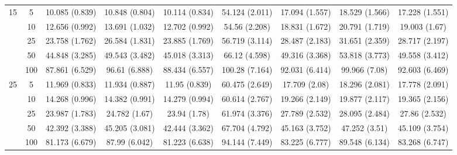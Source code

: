 \documentclass[10pt]{article}
\theoremstyle{definition}
\begin{document}
\begin{sidewaysfigure}
\begin{tabular}{cc|ccc|cccc}
  \multirow{5}{*}{15} & 5  & 10.085 (0.839) & 10.848 (0.804) & 10.114 (0.834) & 54.124 (2.011) & 17.094 (1.557) & 18.529 (1.566) & 17.228 (1.551) \\ 
    & 10  & 12.656 (0.992) & 13.691 (1.032) & 12.702 (0.992) & 54.56 (2.208) & 18.831 (1.672) & 20.791 (1.719) & 19.003 (1.67) \\ 
    & 25 & 23.758 (1.762) & 26.584 (1.831) & 23.885 (1.769) & 56.719 (3.114) & 28.487 (2.183) & 31.651 (2.359) & 28.717 (2.197) \\ 
    & 50 & 44.848 (3.285) & 49.543 (3.482) & 45.018 (3.313) & 66.12 (4.598) & 49.316 (3.368) & 53.818 (3.773) & 49.558 (3.412) \\ 
    & 100 & 87.861 (6.529) & 96.61 (6.888) & 88.434 (6.557) & 100.28 (7.164) & 92.031 (6.414) & 99.966 (7.08) & 92.603 (6.469) \\[.3cm]  
   \multirow{5}{*}{25} & 5 & 11.969 (0.833) & 11.934 (0.887) & 11.95 (0.839) & 60.475 (2.649) & 17.709 (2.08) & 18.296 (2.081) & 17.778 (2.091) \\ 
    & 10 & 14.268 (0.996) & 14.382 (0.991) & 14.279 (0.994) & 60.614 (2.767) & 19.266 (2.149) & 19.877 (2.117) & 19.365 (2.156) \\ 
    & 25 & 23.987 (1.783) & 24.782 (1.67) & 23.94 (1.78) & 61.974 (3.376) & 27.789 (2.532) & 28.095 (2.484) & 27.86 (2.532) \\ 
    & 50 & 42.392 (3.388) & 45.205 (3.081) & 42.444 (3.362) & 67.704 (4.792) & 45.163 (3.752) & 47.252 (3.51) & 45.109 (3.754) \\ 
    & 100 & 81.173 (6.679) & 87.99 (6.042) & 81.223 (6.638) & 94.144 (7.449) & 83.225 (6.777) & 89.548 (6.134) & 83.268 (6.747) \\
\end{tabular}
\end{sidewaysfigure}




\end{document}
